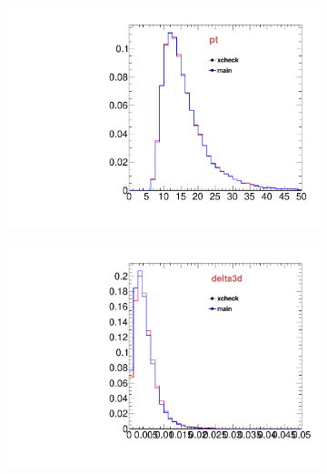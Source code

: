 \begin{figure}
\begin{subfigure}[b]{0.2\textwidth}
                \includegraphics[width=\textwidth]{Figures/VariablesComparison/MC_barrel_figs/pt}
                \label{fig:MC_barrel_pt}
        \end{subfigure}
        \begin{subfigure}[b]{0.2\textwidth}
                \centering
                \includegraphics[width=\textwidth]{Figures/VariablesComparison/MC_barrel_figs/pvip}
                \label{fig:MC_barrel_pvip}
        \end{subfigure}
        \begin{subfigure}[b]{0.2\textwidth}
                \centering

\end{subfigure}
\end{figure}
